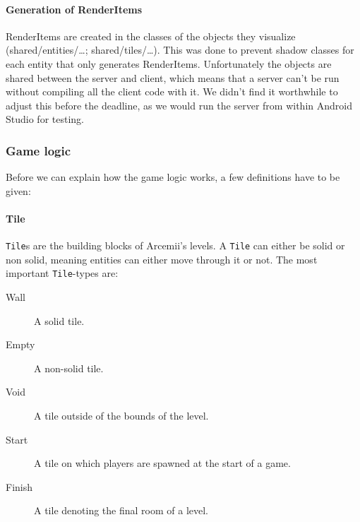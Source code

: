 \documentclass[../main.tex]{subfiles}
\begin{document}
        \paragraph{Generation of RenderItems} RenderItems are created in the classes of the objects they visualize (\tiny shared/entities/\dots; shared/tiles/\dots\normalsize). This was done to prevent shadow classes for each entity that only generates RenderItems. Unfortunately the objects are shared between the server and client, which means that a server can't be run without compiling all the client code with it. We didn't find it worthwhile to adjust this before the deadline, as we would run the server from within Android Studio for testing. 

        
        \subsubsection{Game logic}\label{sec: game logic}
        Before we can explain how the game logic works, a few definitions have to be given:

        \paragraph{Tile} \texttt{Tile}s are the building blocks of Arcemii's levels. A \texttt{Tile} can either be solid or non solid, meaning entities can either move through it or not. The most important \texttt{Tile}-types are:
        \begin{description}
            \item[Wall] A solid tile.
            \item[Empty] A non-solid tile.
            \item[Void] A tile outside of the bounds of the level.
            \item[Start] A tile on which players are spawned at the start of a game.
            \item[Finish] A tile denoting the final room of a level.
        \end{description}
\end{document}
